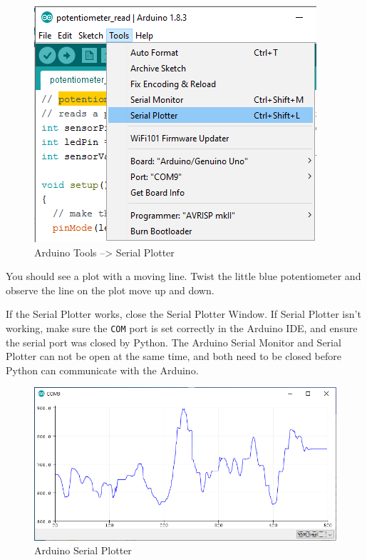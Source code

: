 \documentclass[11pt]{article}
\begin{document}
\begin{figure}
\centering
\includegraphics{images/Tools_SerialPlotter.png}
\caption{Arduino Tools --\textgreater{} Serial Plotter}
\end{figure}

You should see a plot with a moving line. Twist the little blue
potentiometer and observe the line on the plot move up and down.

If the Serial Plotter works, close the Serial Plotter Window. If Serial
Plotter isn't working, make sure the
\texttt{\textquotesingle{}COM\textquotesingle{}} port is set correctly
in the Arduino IDE, and ensure the serial port was closed by Python. The
Arduino Serial Monitor and Serial Plotter can not be open at the same
time, and both need to be closed before Python can communicate with the
Arduino.

\begin{figure}
\centering
\includegraphics{images/serial_plotter_output.png}
\caption{Arduino Serial Plotter}
\end{figure}
\end{document}
